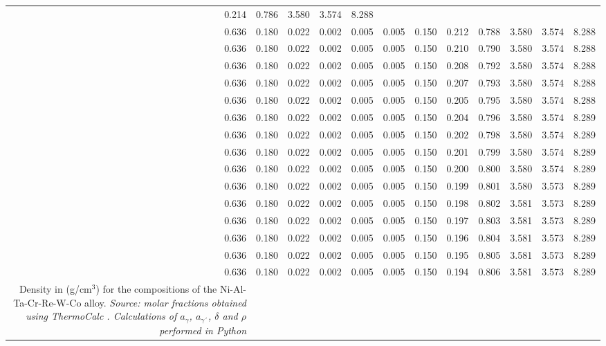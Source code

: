 \begin{longtable}{rrrrrrrrrrrr}
0.214 & 0.786 & 3.580 & 3.574 & 8.288 \\0.636 & 0.180 & 0.022 & 0.002 & 0.005 & 0.005 & 0.150 & 0.212 & 0.788 & 3.580 & 3.574 & 8.288 \\0.636 & 0.180 & 0.022 & 0.002 & 0.005 & 0.005 & 0.150 & 0.210 & 0.790 & 3.580 & 3.574 & 8.288 \\0.636 & 0.180 & 0.022 & 0.002 & 0.005 & 0.005 & 0.150 & 0.208 & 0.792 & 3.580 & 3.574 & 8.288 \\0.636 & 0.180 & 0.022 & 0.002 & 0.005 & 0.005 & 0.150 & 0.207 & 0.793 & 3.580 & 3.574 & 8.288 \\0.636 & 0.180 & 0.022 & 0.002 & 0.005 & 0.005 & 0.150 & 0.205 & 0.795 & 3.580 & 3.574 & 8.288 \\0.636 & 0.180 & 0.022 & 0.002 & 0.005 & 0.005 & 0.150 & 0.204 & 0.796 & 3.580 & 3.574 & 8.289 \\0.636 & 0.180 & 0.022 & 0.002 & 0.005 & 0.005 & 0.150 & 0.202 & 0.798 & 3.580 & 3.574 & 8.289 \\0.636 & 0.180 & 0.022 & 0.002 & 0.005 & 0.005 & 0.150 & 0.201 & 0.799 & 3.580 & 3.574 & 8.289 \\0.636 & 0.180 & 0.022 & 0.002 & 0.005 & 0.005 & 0.150 & 0.200 & 0.800 & 3.580 & 3.574 & 8.289 \\0.636 & 0.180 & 0.022 & 0.002 & 0.005 & 0.005 & 0.150 & 0.199 & 0.801 & 3.580 & 3.573 & 8.289 \\0.636 & 0.180 & 0.022 & 0.002 & 0.005 & 0.005 & 0.150 & 0.198 & 0.802 & 3.581 & 3.573 & 8.289 \\0.636 & 0.180 & 0.022 & 0.002 & 0.005 & 0.005 & 0.150 & 0.197 & 0.803 & 3.581 & 3.573 & 8.289 \\0.636 & 0.180 & 0.022 & 0.002 & 0.005 & 0.005 & 0.150 & 0.196 & 0.804 & 3.581 & 3.573 & 8.289 \\0.636 & 0.180 & 0.022 & 0.002 & 0.005 & 0.005 & 0.150 & 0.195 & 0.805 & 3.581 & 3.573 & 8.289 \\0.636 & 0.180 & 0.022 & 0.002 & 0.005 & 0.005 & 0.150 & 0.194 & 0.806 & 3.581 & 3.573 & 8.289 \\
    \caption{\centering Density in (g/cm$^3$) for the compositions of the Ni-Al-Ta-Cr-Re-W-Co alloy. \\
    \textit{Source: molar fractions obtained using ThermoCalc \citep{thermocalc}. Calculations of $a_\gamma$, $a_{\gamma´}$, $\delta$ and $\rho$ performed in Python \citep{mygit}}}
    \label{tab:tab12}
\end{longtable}


